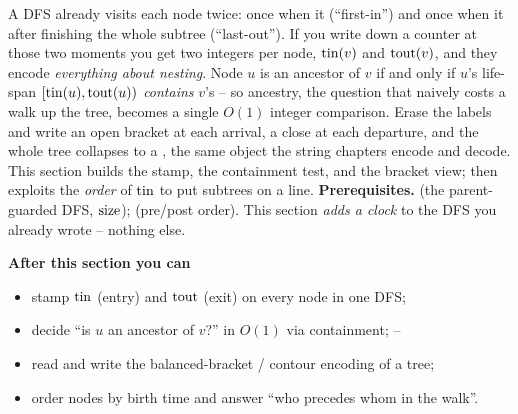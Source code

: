 \begin{topicintro}
A DFS already visits each node twice: once when it  (``first-in'') and once
when it  after finishing the whole subtree (``last-out''). If you write down a
counter at those two moments you get two integers per node, $\operatorname{tin}(v)$ and $\operatorname{tout}(v)$, and
they encode \emph{everything about nesting}. Node $u$ is an ancestor of $v$ if and only if
$u$'s life-span $[\operatorname{tin}(u), \operatorname{tout}(u))$ \emph{contains} $v$'s -- so ancestry, the question
that naively costs a walk up the tree, becomes a single $O(1)$ integer comparison. Erase the
labels and write an open bracket at each arrival, a close at each departure, and the whole
tree collapses to a , the same object the string chapters
encode and decode. This section builds the stamp, the containment test, and the bracket
view;  then exploits the \emph{order} of $\operatorname{tin}$ to put subtrees on a
line.
\textbf{Prerequisites.}  (the parent-guarded DFS, $\operatorname{size}$); 
(pre/post order). This section \emph{adds a clock} to the DFS you already wrote -- nothing
else.

\textbf{After this section you can}
\begin{itemize}[nosep]
  \item stamp $\operatorname{tin}$ (entry) and $\operatorname{tout}$ (exit) on every node in one DFS;   \hfill{}
  \item decide ``is $u$ an ancestor of $v$?'' in $O(1)$ via containment;    \hfill{}--
  \item read and write the balanced-bracket / contour encoding of a tree;   \hfill{}
  \item order nodes by birth time and answer ``who precedes whom in the walk''. \hfill{}
\end{itemize}
\end{topicintro}

